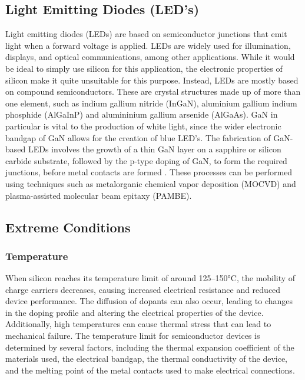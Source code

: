 \begin{refsection}
\subsection{Light Emitting Diodes (LED's)}
Light emitting diodes (LEDs) are based on semiconductor junctions that emit light when a forward voltage is applied. LEDs are widely used for illumination, displays, and optical communications, among other applications. While it would be ideal to simply use silicon for this application, the electronic properties of silicon make it quite unsuitable for this purpose. Instead, LEDs are mostly based on compound semiconductors. These are crystal structures made up of more than one element, such as indium gallium nitride (InGaN), aluminium gallium indium phosphide (AlGaInP) and alumininium gallium arsenide (AlGaAs). GaN in particular is vital to the production of white light, since the wider electronic bandgap of GaN allows for the creation of blue LED's. The fabrication of GaN-based LEDs involves the growth of a thin GaN layer on a sapphire or silicon carbide substrate, followed by the p-type doping of GaN, to form the required junctions, before metal contacts are formed \cite{nakamura1994}. These processes can be performed using techniques such as metalorganic chemical vapor deposition (MOCVD) and plasma-assisted molecular beam epitaxy (PAMBE).

\subsection{Extreme Conditions}
\subsubsection{Temperature}
When silicon reaches its temperature limit of around 125--150\si{\degreeCelsius}, the mobility of charge carriers decreases, causing increased electrical resistance and reduced device performance. The diffusion of dopants can also occur, leading to changes in the doping profile and altering the electrical properties of the device. Additionally, high temperatures can cause thermal stress that can lead to mechanical failure. The temperature limit for semiconductor devices is determined by several factors, including the thermal expansion coefficient of the materials used, the electrical bandgap, the thermal conductivity of the device, and the melting point of the metal contacts used to make electrical connections. 


\end{refsection}
